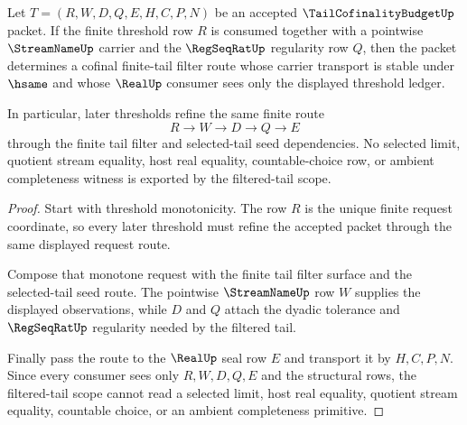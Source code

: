 \begin{theorem}
\label{thm:tail-cofinality-budget-filtered-tail-scope}
Let $T=(R,W,D,Q,E,H,C,P,N)$ be an accepted $\TailCofinalityBudgetUp$ packet. If the finite threshold row $R$ is consumed together with a pointwise $\StreamNameUp$ carrier and the $\RegSeqRatUp$ regularity row $Q$, then the packet determines a cofinal finite-tail filter route whose carrier transport is stable under $\hsame$ and whose $\RealUp$ consumer sees only the displayed threshold ledger.

In particular, later thresholds refine the same finite route
$$
R \longrightarrow W \longrightarrow D \longrightarrow Q \longrightarrow E
$$
through the finite tail filter and selected-tail seed dependencies. No selected limit, quotient stream equality, host real equality, countable-choice row, or ambient completeness witness is exported by the filtered-tail scope.
\end{theorem}
\begin{proof}
Start with threshold monotonicity. The row $R$ is the unique finite request coordinate, so every later threshold must refine the accepted packet through the same displayed request route.

Compose that monotone request with the finite tail filter surface and the selected-tail seed route. The pointwise $\StreamNameUp$ row $W$ supplies the displayed observations, while $D$ and $Q$ attach the dyadic tolerance and $\RegSeqRatUp$ regularity needed by the filtered tail.

Finally pass the route to the $\RealUp$ seal row $E$ and transport it by $H,C,P,N$. Since every consumer sees only $R,W,D,Q,E$ and the structural rows, the filtered-tail scope cannot read a selected limit, host real equality, quotient stream equality, countable choice, or an ambient completeness primitive.
\end{proof}

